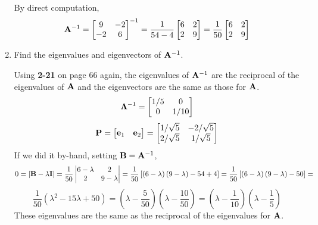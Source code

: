 \begin{enumerate}[label=(\alph*)]
            By direct computation,
            \[
                \bold{A}^{-1} = 
                \begin{bmatrix}
                    9 & -2 \\
                    -2 & 6
                \end{bmatrix}^{-1} = 
                \frac{1}{54-4}
                \begin{bmatrix}
                    6 & 2 \\
                    2 & 9
                \end{bmatrix} =
                \frac{1}{50}
                \begin{bmatrix}
                    6 & 2 \\
                    2 & 9
                \end{bmatrix}
            \]
            \item Find the eigenvalues and eigenvectors of $\bold{A}^{-1}$.
            \par
            Using \textbf{2-21} on page 66 again, the eigenvalues of $\bold{A}^{-1}$ are the reciprocal of the eigenvalues of $\bold{A}$ and the eigenvectors are the same as those for $\bold{A}$.
            \[
                \bold{\Lambda}^{-1}
                =
                \begin{bmatrix}
                    1/5 & 0 \\
                    0 & 1/10
                \end{bmatrix}
            \]
            \[
                \bold{P} =
                \begin{bmatrix}
                    \bold{e}_1 & \bold{e}_2
                \end{bmatrix} =
                \begin{bmatrix}
                    1/\sqrt{5} & -2/\sqrt{5} \\
                    2/\sqrt{5} & 1/\sqrt{5}
                \end{bmatrix}
            \]
            If we did it by-hand, setting $\bold{B} = \bold{A}^{-1}$,
            \[
                0 = \left|\bold{B} - \lambda\bold{I}\right|
                =
                \frac{1}{50}
                \left|
                \begin{matrix}
                    6 - \lambda & 2 \\
                    2 & 9 - \lambda
                \end{matrix}
                \right| = 
                \frac{1}{50} \left[\left(6 - \lambda\right)\left(9 - \lambda\right) - 54 + 4\right] =
                \frac{1}{50} \left[\left(6 - \lambda\right)\left(9 - \lambda\right) - 50\right] =
            \]
            \[
                \frac{1}{50} \left(\lambda^2 - 15\lambda + 50\right) =
                \left(\lambda - \frac{5}{50}\right)\left(\lambda - \frac{10}{50}\right) =
                \left(\lambda - \frac{1}{10}\right)\left(\lambda - \frac{1}{5}\right)
            \]
            These eigenvalues are the same as the reciprocal of the eigenvalues for $\bold{A}$.
        \end{enumerate}